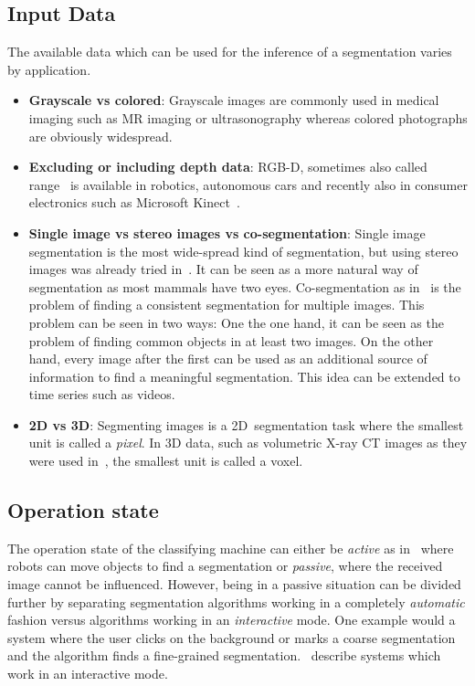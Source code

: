 \subsection{Input Data}\label{subsec:input-data}
The available data which can be used for the inference of a segmentation varies
by application.

\begin{itemize}
    \item \textbf{Grayscale vs colored}: Grayscale images are commonly used in
          medical imaging such as \gls{MR} imaging or ultrasonography whereas
          colored photographs are obviously widespread.
    \item \textbf{Excluding or including depth data}: RGB-D, sometimes also
          called range~\cite{hoover1996experimental} is available in robotics,
          autonomous cars and recently also in consumer electronics such as
          Microsoft Kinect~\cite{6190806}.
    \item \textbf{Single image vs stereo images vs co-segmentation}: Single
          image segmentation is the most wide-spread kind of segmentation, but
          using stereo images was already tried in~\cite{boykov2001fast}. It
          can be seen as a more natural way of segmentation as most mammals
          have two eyes.
          Co-segmentation as in~\cite{1640859,collins2012random} is the problem
          of finding a consistent segmentation for multiple images. This problem
          can be seen in two ways: One the one hand, it can be seen as the problem
          of finding common objects in at least two images. On the other hand,
          every image after the first can be used as an additional source of
          information to find a meaningful segmentation. This idea can be
          extended to time series such as videos.
    \item \textbf{2D vs 3D}: Segmenting images is a 2D~segmentation task where
          the smallest unit is called a \textit{pixel}. In 3D data, such as
          volumetric X-ray CT images as they were used in~\cite{929615}, the
          smallest unit is called a voxel.
\end{itemize}


\subsection{Operation state}\label{subsec:operation-state}
The operation state of the classifying machine can either be \textit{active} as
in~\cite{schiebener2011segmentation,schiebener2012discovery} where robots can
move objects to find a segmentation or \textit{passive}, where the received
image cannot be influenced. However, being in a passive situation can be
divided further by separating segmentation algorithms working in a completely
\textit{automatic} fashion versus algorithms working in an \textit{interactive}
mode. One example would a system where the user clicks on the background or
marks a coarse segmentation and the algorithm finds a fine-grained
segmentation.
\cite{boykov2000interactive,rother2004grabcut,protiere2007interactive}~describe
systems which work in an interactive mode.

